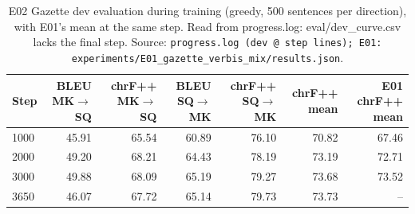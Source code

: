 \begin{table}[t]
\centering
\small
\begin{tabular}{lrrrrrr}
\toprule
Step & BLEU MK$\rightarrow$SQ & chrF++ MK$\rightarrow$SQ & BLEU SQ$\rightarrow$MK & chrF++ SQ$\rightarrow$MK & chrF++ mean & E01 chrF++ mean \\
\midrule
1000 & 45.91 & 65.54 & 60.89 & 76.10 & 70.82 & 67.46 \\
2000 & 49.20 & 68.21 & 64.43 & 78.19 & 73.19 & 72.71 \\
3000 & 49.88 & 68.09 & 65.19 & 79.27 & 73.68 & 73.52 \\
3650 & 46.07 & 67.72 & 65.14 & 79.73 & 73.73 & -- \\
\bottomrule
\end{tabular}
\caption{E02 Gazette dev evaluation during training (greedy, 500 sentences per direction), with E01's mean at the same step. Read from progress.log: eval/dev\_curve.csv lacks the final step. Source: \texttt{progress.log (dev @ step lines); E01: experiments/E01\_gazette\_verbis\_mix/results.json}.}
\label{tab:e02-dev-curve}
\end{table}
